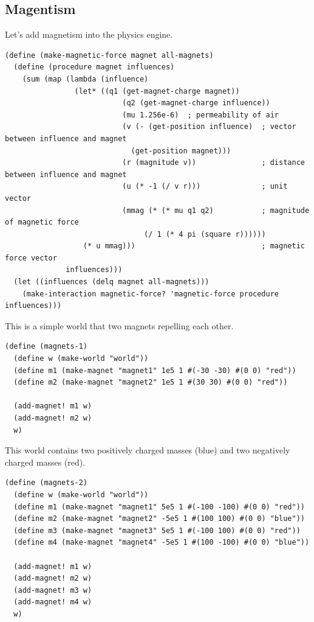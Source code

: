 \documentclass{article}
\begin{document}
\subsection{Magentism}
Let's add magnetism into the physics engine. 
{\small\begin{verbatim}
(define (make-magnetic-force magnet all-magnets)
  (define (procedure magnet influences)
    (sum (map (lambda (influence)
                (let* ((q1 (get-magnet-charge magnet))
                           (q2 (get-magnet-charge influence))
                           (mu 1.256e-6)  ; permeability of air
                           (v (- (get-position influence)  ; vector between influence and magnet
                             (get-position magnet)))
                           (r (magnitude v))               ; distance between influence and magnet
                           (u (* -1 (/ v r)))              ; unit vector
                           (mmag (* (* mu q1 q2)           ; magnitude of magnetic force
                                (/ 1 (* 4 pi (square r))))))
                  (* u mmag)))                             ; magnetic force vector
              influences)))
  (let ((influences (delq magnet all-magnets)))
    (make-interaction magnetic-force? 'magnetic-force procedure influences)))
\end{verbatim}}

This is a simple world that two magnets repelling each other.
{\small\begin{verbatim}
(define (magnets-1)
  (define w (make-world "world"))
  (define m1 (make-magnet "magnet1" 1e5 1 #(-30 -30) #(0 0) "red"))
  (define m2 (make-magnet "magnet2" 1e5 1 #(30 30) #(0 0) "red"))

  (add-magnet! m1 w)
  (add-magnet! m2 w)
  w)
\end{verbatim}}

This world contains two positively charged masses (blue) and two negatively charged masses (red).
{\small\begin{verbatim}
(define (magnets-2)
  (define w (make-world "world"))
  (define m1 (make-magnet "magnet1" 5e5 1 #(-100 -100) #(0 0) "red"))
  (define m2 (make-magnet "magnet2" -5e5 1 #(100 100) #(0 0) "blue"))
  (define m3 (make-magnet "magnet3" 5e5 1 #(-100 100) #(0 0) "red"))
  (define m4 (make-magnet "magnet4" -5e5 1 #(100 -100) #(0 0) "blue"))

  (add-magnet! m1 w)
  (add-magnet! m2 w)
  (add-magnet! m3 w)
  (add-magnet! m4 w)
  w)
\end{verbatim}}
\end{document}

